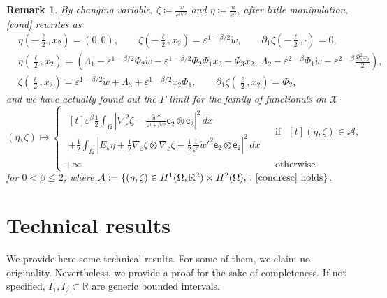 \documentclass[a4, 11pt, reqno, final]{amsart}
\newcommand{\calA}{\mathcal{A}}
\newcommand{\calX}{\mathcal{X}}
\newcommand{\bbR}{\mathbb{R}}
\newcommand\e{\varepsilon}
\theoremstyle{plain}%
\newtheorem{remark}[theorem]{Remark}
\DeclareMathOperator{\st}{\,:\,}
\begin{document}
	\begin{remark}
		By changing variable, $\zeta \coloneqq   \frac{w}{\e^{\beta/2}}$ and $\eta \coloneqq   \frac{u}{\e^\beta}$, after little manipulation, \eqref{cond} rewrites as
		\begin{equation}\label{condresc}
			\begin{aligned}
				&	\eta(-\frac{\ell}{2}, x_2) = (0,0), \qquad \zeta(-\frac{\ell}{2}, x_2) = \e^{1-\beta/2}\mathring{w}, \qquad \partial_1 \zeta(-\frac{\ell}{2}, \cdot)=0, \\
				&	\eta(\frac{\ell}{2}, x_2) =
				(\Lambda_1 -\e^{1-\beta/2}\Phi_2\mathring{w} -\e^{1-\beta/2} \Phi_2\Phi_1 x_2 - \Phi_3 x_2, \ \Lambda_2 - \e^{2-\beta} \Phi_1\mathring{w} -\e^{2-\beta} \frac{\Phi_1^2 x_2}{2}),\\
				&	\zeta(\frac{\ell}{2}, x_2) = \e^{1-\beta/2}\mathring{w} + \Lambda_3 + \e^{1-\beta/2} x_2 \Phi_1, \qquad   \partial_1 \zeta(\frac{\ell}{2}, x_2)= \Phi_2,
			\end{aligned}
		\end{equation}
		and we have actually found out the $\Gamma$-limit for the family of functionals on $\calX$
		$$ (\eta, \zeta) \mapsto \begin{cases}
			\begin{multlined}[t]
				\e^\beta \frac12\int_\Omega |\nabla^2_\e \zeta - \frac{\mathring{w}''}{\e^{1+\beta/2}} \mathsf{e}_2 \otimes \mathsf{e}_2|^2 \, dx \\+ \frac12 \int_\Omega |E_\e \eta + \frac12 \nabla_\e \zeta\otimes \nabla_\e \zeta - \frac12 \frac{1}{\e^\beta} \mathring{w}'^2 \mathsf{e}_2 \otimes \mathsf{e}_2 |^2 \, dx
			\end{multlined} & \text{ if } \begin{multlined}[t]
				(\eta, \zeta) \in \calA,
			\end{multlined}\\
			+\infty & \text{ otherwise }
		\end{cases}$$
		for $0<\beta \leq 2$, where $\calA := \{(\eta, \zeta)\in H^1(\Omega,\bbR^2)\times H^2(\Omega), \st \eqref{condresc} \text{ holds}\}$.
	\end{remark}






	\appendix

	\section{Technical results}
	We provide here some technical results. For some of them, we claim no originality. Nevertheless, we provide a proof for the sake of completeness.
	If not specified, $I_1, I_2 \subset \bbR$ are generic bounded intervals.
\end{document}
